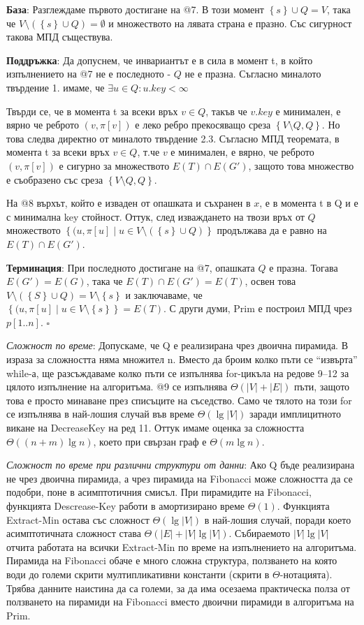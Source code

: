 \documentclass{article}
\renewcommand{\\}{\newline}
\newcommand{\sep}{\;|\;}
\newcommand{\proven}{\hfill $\square$}
\begin{document}
\textbf{База}: Разглеждаме първото достигане на @7. В този момент \(\left\{s\right\} \cup Q = V\), така че \(V \setminus (\left\{s\right\} \cup Q) = \emptyset\) и множеството на лявата страна е празно. Със сигурност такова МПД съществува. 

\textbf{Поддръжка}: Да допуснем, че инвариантът е в сила в момент t, в който изпълнението на @7 не е последното - \(Q\) не е празна. Съгласно миналото твърдение 1. имаме, че \(\exists u \in Q: u.key < \infty\)

Твърди се, че в момента t за всеки връх \(v \in Q\), такъв че \(v.key\) е минимален, е вярно че реброто \((v, \pi[v])\) е леко ребро прекосяващо среза \(\left\{V \setminus Q, Q\right\}\). Но това следва директно от миналото твърдение 2.3. Съгласно МПД теоремата, в момента t за всеки връх \(v \in Q\), т.че \(v\) е минимален, е вярно, че реброто \((v, \pi[v])\) е сигурно за множеството \(E(T) \cap E(G')\), защото това множество е съобразено със среза \(\left\{V\setminus Q, Q\right\}\).

На @8 върхът, който е изваден от опашката и съхранен в \(x\), е в момента t в Q и е с минимална key стойност. Оттук, след изваждането на твози връх от \(Q\) множеството \(\left\{(u, \pi[u] \sep u \in V \setminus (\left\{s\right\} \cup Q)\right\}\) продължава да е равно на \(E(T) \cap E(G')\). 

\textbf{Терминация}: При последното достигане на @7, опашката \(Q\) е празна. Тогава \(E(G') = E(G)\), така че \(E(T) \cap E(G') = E(T)\), освен това \(V \setminus (\left\{S\right\} \cup Q) = V \setminus \left\{s\right\}\) и заключаваме, че \(\left\{(u, \pi[u] \sep u \in V\setminus \left\{s\right\}\right\}= E(T)\). С други думи, Prim е построил МПД чрез \(p[1..n]\). \proven      

\textit{Сложност по време}: Допускаме, че Q е реализирана чрез двоична пирамида. В израза за сложността няма множител n. Вместо да броим колко пъти се “извърта” while-а, ще разсъждаваме колко пъти се изпълнява for-цикъла на редове 9–12 за цялото изпълнение на алгоритъма. @9 се изпълнява \(\Theta(|V| + |E|)\) пъти, защото това е просто минаване през списъците на съседство. Само че тялото на този for се изпълнява в най-лошия случай във време \(\Theta(\lg |V|)\) заради имплицитното викане на DecreaseKey на ред 11. Оттук имаме оценка за сложността \(\Theta((n+m)\lg n)\), което при свързан граф е \(\Theta(m \lg n)\).

\textit{Сложност по време при различни структури от данни}: Ако Q бъде реализирана не чрез двоична пирамида, а чрез пирамида на Fibonacci може сложността да се подобри, поне в асимптотичния смисъл. При пирамидите на Fibonacci, функцията Descrease-Key работи в амортизирано време \(\Theta(1)\). Функцията Extract-Min остава със сложност \(\Theta(\lg |V|)\) в най-лошия случай, поради което асимптотичната сложност става \(\Theta(|E| + |V|\lg |V|)\). Събираемото \(|V|\lg |V|\) отчита работата на всички Extract-Min по време на изпълнението на алгоритъма. Пирамида на Fibonacci обаче е много сложна структура, ползването на която води до големи скрити мултипликативни константи (скрити в \(\Theta\)-нотацията). Трябва данните наистина да са големи, за да има осезаема практическа полза от ползването на пирамиди на Fibonacci вместо двоични пирамиди в алгоритъма на Prim.
\end{document}
